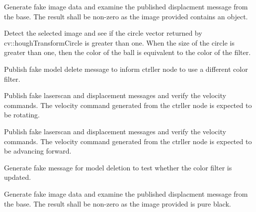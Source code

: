 
\begin{DoxyRefList}
\item[\label{test__test000001}%
\hypertarget{test__test000001}{}%
Member \hyperlink{base__test_8cpp_a349859c03dcbb00f53a4811ba16e656d}{T\+E\+ST} (Integration\+Test, Tsk\+T7\+\_\+velocity\+\_\+command\+\_\+red)]Generate fake image data and examine the published displacment message from the base. The result shall be non-\/zero as the image provided contains an object.  
\item[\label{test__test000007}%
\hypertarget{test__test000007}{}%
Member \hyperlink{imageProcess__test_8cpp_ae46f88af81d5d238b8122322cfc9bb2c}{T\+E\+ST} (Unit\+Testing, color\+\_\+test\+\_\+blue\+\_\+green)]Detect the selected image and see if the circle vector returned by cv\+::hough\+Transform\+Circle is greater than one. When the size of the circle is greater than one, then the color of the ball is equivalent to the color of the filter.  
\item[\label{test__test000006}%
\hypertarget{test__test000006}{}%
Member \hyperlink{ctrller__test_8cpp_a79421247807ffa48d400b071414f5bb9}{T\+E\+ST} (integration\+Test, Tsk\+T3\+\_\+color\+\_\+removal)]Publish fake model delete message to inform ctrller node to use a different color filter.  
\item[\label{test__test000005}%
\hypertarget{test__test000005}{}%
Member \hyperlink{ctrller__test_8cpp_a4ef4671d1ede6401e0a79775a595a390}{T\+E\+ST} (integration\+Test, Tsk\+T1\+\_\+turn)]Publish fake laserscan and displacement messages and verify the velocity commands. The velocity command generated from the ctrller node is expected to be rotating.  
\item[\label{test__test000004}%
\hypertarget{test__test000004}{}%
Member \hyperlink{ctrller__test_8cpp_ae36b06d26d7d597b70255a8058ab86ec}{T\+E\+ST} (integration\+Test, Tsk\+T1\+\_\+advance)]Publish fake laserscan and displacement messages and verify the velocity commands. The velocity command generated from the ctrller node is expected to be advancing forward.  
\item[\label{test__test000003}%
\hypertarget{test__test000003}{}%
Member \hyperlink{base__test_8cpp_a56a3a7485a41709f6a65d4fb445829cc}{T\+E\+ST} (Integration\+Test, Tsk\+T6\+\_\+change\+\_\+color)]Generate fake message for model deletion to test whether the color filter is updated.  
\item[\label{test__test000002}%
\hypertarget{test__test000002}{}%
Member \hyperlink{base__test_8cpp_a54beffadef3e147e50f9a1c1981e6b97}{T\+E\+ST} (Integration\+Test, Tsk\+T7\+\_\+velocity\+\_\+command\+\_\+void)]Generate fake image data and examine the published displacment message from the base. The result shall be non-\/zero as the image provided is pure black. 
\end{DoxyRefList}